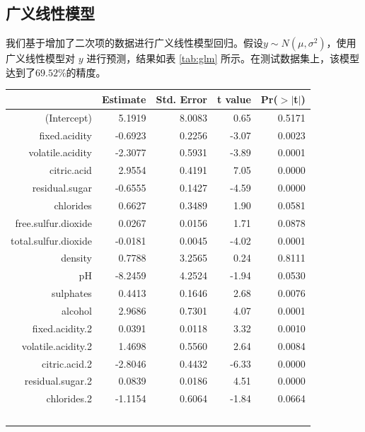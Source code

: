 \documentclass[fontset=ubuntu]{ctexart}
\begin{document}
        \subsection{广义线性模型}
            我们基于增加了二次项的数据进行广义线性模型回归。假设$ y \sim N(\mu, \sigma^2)$，使用广义线性模型对 $y$ 进行预测，结果如表 \ref{tab:glm} 所示。在测试数据集上，该模型达到了$69.52\%$的精度。
            \begin{table}[ht]
                \centering
                \begin{tabular}{rrrrr}
                    \hline
                    & Estimate & Std. Error & t value & Pr($>$$|$t$|$) \\ 
                    \hline
                    (Intercept) & 5.1919 & 8.0083 & 0.65 & 0.5171 \\ 
                    fixed.acidity & -0.6923 & 0.2256 & -3.07 & 0.0023 \\ 
                    volatile.acidity & -2.3077 & 0.5931 & -3.89 & 0.0001 \\ 
                    citric.acid & 2.9554 & 0.4191 & 7.05 & 0.0000 \\ 
                    residual.sugar & -0.6555 & 0.1427 & -4.59 & 0.0000 \\ 
                    chlorides & 0.6627 & 0.3489 & 1.90 & 0.0581 \\ 
                    free.sulfur.dioxide & 0.0267 & 0.0156 & 1.71 & 0.0878 \\ 
                    total.sulfur.dioxide & -0.0181 & 0.0045 & -4.02 & 0.0001 \\ 
                    density & 0.7788 & 3.2565 & 0.24 & 0.8111 \\ 
                    pH & -8.2459 & 4.2524 & -1.94 & 0.0530 \\ 
                    sulphates & 0.4413 & 0.1646 & 2.68 & 0.0076 \\ 
                    alcohol & 2.9686 & 0.7301 & 4.07 & 0.0001 \\ 
                    fixed.acidity.2 & 0.0391 & 0.0118 & 3.32 & 0.0010 \\ 
                    volatile.acidity.2 & 1.4698 & 0.5560 & 2.64 & 0.0084 \\ 
                    citric.acid.2 & -2.8046 & 0.4432 & -6.33 & 0.0000 \\ 
                    residual.sugar.2 & 0.0839 & 0.0186 & 4.51 & 0.0000 \\ 
                    chlorides.2 & -1.1154 & 0.6064 & -1.84 & 0.0664 \\ 
$$
\end{tabular}
\end{table}
\end{document}
